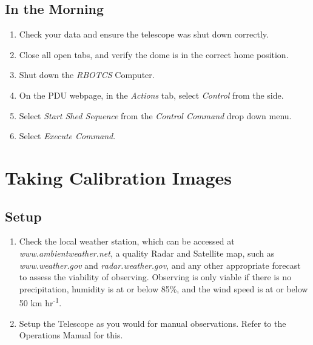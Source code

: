 \documentclass[letterpaper,12pt]{article}
\begin{document}
	\subsection{In the Morning}
	\begin{enumerate}
		\item Check your data and ensure the telescope was shut down correctly.
		\item Close all open tabs, and verify the dome is in the correct home position.
		\item Shut down the \textit{RBOTCS} Computer.
		\item On the PDU webpage, in the \textit{Actions} tab, select \textit{Control} from the side.
		\item Select \textit{Start Shed Sequence} from the \textit{Control Command} drop down menu.
		\item Select \textit{Execute Command}.
	\end{enumerate}
\newpage
\section{Taking Calibration Images}
\subsection{Setup}
\begin{enumerate}
	\item Check the local weather station, which can be accessed at \textit{www.ambientweather.net}, a quality Radar and Satellite map, such as \textit{www.weather.gov} and \textit{radar.weather.gov}, and any other appropriate forecast to assess the viability of observing. Observing is only viable if there is no precipitation, humidity is at or below 85\%, and the wind speed is at or below 50 km hr\textsuperscript{-1}.
	\item Setup the Telescope as you would for manual observations. Refer to the Operations Manual for this.
\end{enumerate}
\end{document}
